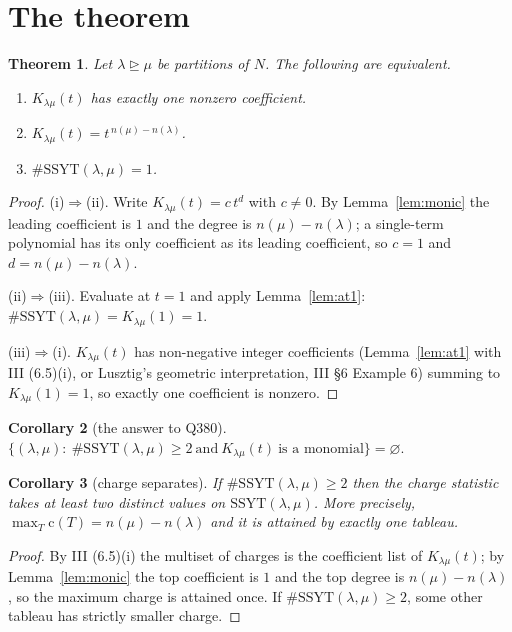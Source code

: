 \documentclass[11pt]{article}
\theoremstyle{plain}
\newtheorem{theorem}{Theorem}
\newtheorem{corollary}[theorem]{Corollary}
\theoremstyle{definition}
\newcommand{\SSYT}{\mathrm{SSYT}}
\newcommand{\charge}{\mathrm{c}}
\DeclareMathOperator{\dom}{\trianglerighteq}
\begin{document}
\section{The theorem}

\begin{theorem}\label{thm:main}
Let $\lambda\dom\mu$ be partitions of $N$.  The following are equivalent.
\begin{enumerate}
\item[(i)] $K_{\lambda\mu}(t)$ has exactly one nonzero coefficient.
\item[(ii)] $K_{\lambda\mu}(t)=t^{\,n(\mu)-n(\lambda)}$.
\item[(iii)] $\#\SSYT(\lambda,\mu)=1$.
\end{enumerate}
\end{theorem}

\begin{proof}
(i)$\Rightarrow$(ii).  Write $K_{\lambda\mu}(t)=c\,t^{d}$ with $c\neq 0$.  By
Lemma~\ref{lem:monic} the leading coefficient is $1$ and the degree is
$n(\mu)-n(\lambda)$; a single-term polynomial has its only coefficient as its leading
coefficient, so $c=1$ and $d=n(\mu)-n(\lambda)$.

(ii)$\Rightarrow$(iii).  Evaluate at $t=1$ and apply Lemma~\ref{lem:at1}:
$\#\SSYT(\lambda,\mu)=K_{\lambda\mu}(1)=1$.

(iii)$\Rightarrow$(i).  $K_{\lambda\mu}(t)$ has non-negative integer coefficients
(Lemma~\ref{lem:at1} with III (6.5)(i), or Lusztig's geometric interpretation, III \S6
Example 6) summing to $K_{\lambda\mu}(1)=1$, so exactly one coefficient is nonzero.
\end{proof}

\begin{corollary}[the answer to Q380]\label{cor:q380}
$\big\{(\lambda,\mu):\ \#\SSYT(\lambda,\mu)\ge 2\ \text{and}\ K_{\lambda\mu}(t)
\ \text{is a monomial}\big\}=\varnothing.$
\end{corollary}

\begin{corollary}[charge separates]\label{cor:charge}
If $\#\SSYT(\lambda,\mu)\ge 2$ then the charge statistic takes at least two distinct
values on $\SSYT(\lambda,\mu)$.  More precisely, $\max_T \charge(T)=n(\mu)-n(\lambda)$ and
it is attained by exactly one tableau.
\end{corollary}

\begin{proof}
By III (6.5)(i) the multiset of charges is the coefficient list of $K_{\lambda\mu}(t)$;
by Lemma~\ref{lem:monic} the top coefficient is $1$ and the top degree is
$n(\mu)-n(\lambda)$, so the maximum charge is attained once.  If
$\#\SSYT(\lambda,\mu)\ge2$, some other tableau has strictly smaller charge.
\end{proof}
\end{document}
